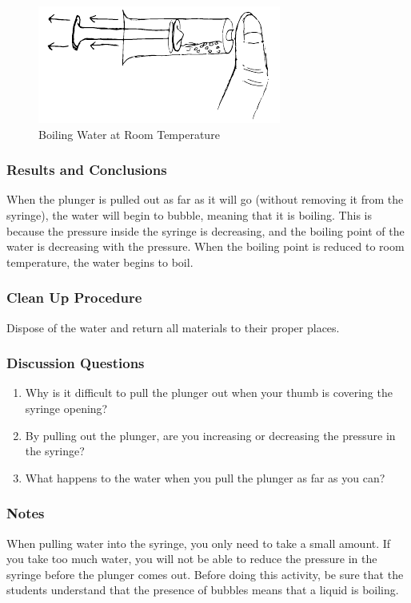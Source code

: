 \begin{figure}
\begin{center}
\includegraphics{./img/boiling-room-temp.png}
\caption{Boiling Water at Room Temperature}
\label{fig:boiling-room-temp}
\end{center}
\end{figure}

\subsubsection*{Results and Conclusions}
When the plunger is pulled out as far as it will go (without removing it from the syringe), the water will begin to bubble, meaning that it is boiling. This is because the pressure inside the syringe is decreasing, and the boiling point of the water is decreasing with the pressure. When the boiling point is reduced to room temperature, the water begins to boil.  

\subsubsection*{Clean Up Procedure}
Dispose of the water and return all materials to their proper places.

\subsubsection*{Discussion Questions}
\begin{enumerate}
\item{Why is it difficult to pull the plunger out when your thumb is covering the syringe opening?}
\item{By pulling out the plunger, are you increasing or decreasing the pressure in the syringe?}
\item{What happens to the water when you pull the plunger as far as you can?}
\end{enumerate}

\subsubsection*{Notes}
When pulling water into the syringe, you only need to take a small amount. If you take too much water, you will not be able to reduce the pressure in the syringe before the plunger comes out.  
Before doing this activity, be sure that the students understand that the presence of bubbles means that a liquid is boiling.


